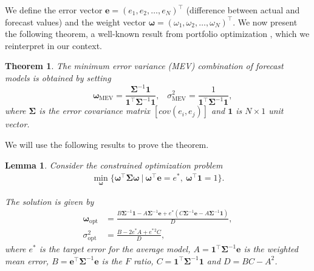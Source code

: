 \documentclass{article}
\newtheorem{theorem}{Theorem}
\newtheorem{lemma}{Lemma}
\begin{document}
We define the error vector $\mathbf{e} = (e_1, e_2, \ldots, e_N)^\top$ (difference between actual and forecast values) and the weight vector $\boldsymbol{\omega} = (\omega_1, \omega_2, \ldots, \omega_N)^\top$. We now present the following theorem, a well-known result from portfolio optimization \cite{markowitz1952portfolio}, which we reinterpret in our context. 
\begin{theorem} \label{thm2}
The minimum error variance (MEV) combination of forecast models is obtained by setting
\begin{equation} \label{opt}
 \quad \boldsymbol{\omega}_{\text{MEV}} = \frac{\mathbf{\Sigma}^{-1} \mathbf{1}}{\mathbf{1}^\top \mathbf{\Sigma}^{-1}\mathbf{1}}\text{,} \quad \sigma_{\text{MEV}}^2 = \frac{1}{\mathbf{1}^\top \mathbf{\Sigma}^{-1}\mathbf{1}} \text{,} 
\end{equation}
where $\mathbf{\Sigma}$ is the error covariance matrix $[cov(e_i,e_j)]$ and $\mathbf{1}$ is $ N \times 1$ unit vector.
\end{theorem}
We will use the following results to prove the theorem.
\begin{lemma}
Consider the constrained optimization problem 
\begin{align} \label{opt1}
\min_{\boldsymbol{\omega}} \{ \boldsymbol{\omega}^\top \mathbf{\Sigma} \boldsymbol{\omega}~|~\boldsymbol{\omega}^\top \mathbf{e} = e^*,~\boldsymbol{\omega}^\top \mathbf{1} = 1\}.
\end{align}

The solution is given by 
\begin{equation}
\begin{aligned} \label{opt2}
\boldsymbol{\omega}_{\text{opt}} &= \frac{B \mathbf{\Sigma}^{-1} \mathbf{1} - A \mathbf{\Sigma}^{-1} \mathbf{e} + e^* \left( C \mathbf{\Sigma}^{-1} \mathbf{e} - A \mathbf{\Sigma}^{-1} \mathbf{1} \right)}{D}, \\
\sigma_{\text{opt}}^2 &= \frac{B - 2e^* A + e^*{^2} C}{D},
\end{aligned}
\end{equation}
where $e^*$ is the target error for the average model, $A = \mathbf{1}^\top \mathbf{\Sigma}^{-1} \mathbf{e}$ is the weighted mean error, $B = \mathbf{e}^\top \mathbf{\Sigma}^{-1} \mathbf{e}$ is the $F$ ratio, $C = \mathbf{1}^\top \mathbf{\Sigma}^{-1}\mathbf{1}$ and $D = BC - A^2$.
\end{lemma}
\end{document}
